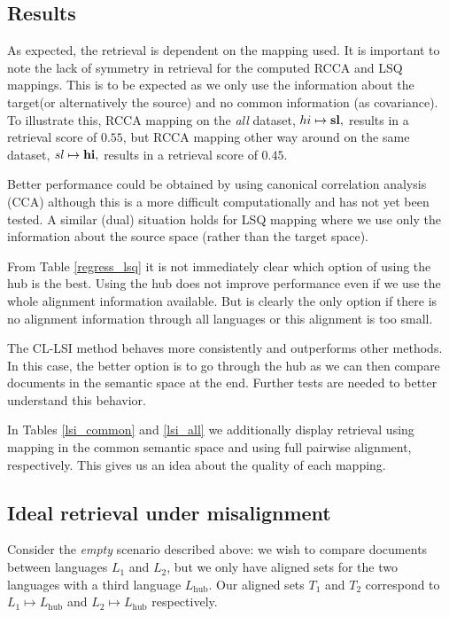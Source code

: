 \documentclass[twocolumn, draft]{article}
\begin{document}
\vspace{-0.2cm}
\subsection{Results}
\vspace{-0.2cm}
As expected, the retrieval is dependent on the mapping used.  It
is important to note the lack of symmetry in retrieval for the
computed RCCA and LSQ mappings.  This is to be expected as we
only use the information about the target(or alternatively the
source) and no common information (as covariance). To illustrate
this, RCCA mapping on the \emph{all} dataset, $hi \mapsto {\bf
  sl},$ results in a retrieval score of $0.55$, but RCCA mapping
other way around on the same dataset, $sl \mapsto {\bf hi},$
results in a retrieval score of $0.45$.

Better performance could be obtained by using canonical
correlation analysis (CCA) although this is a more difficult
computationally and has not yet been tested.  A similar (dual) situation
holds for LSQ mapping where we use only the information about the
source space (rather than the target space).


From Table \ref{regress_lsq} it is not immediately clear which
option of using the hub is the best.  Using the hub does not
improve performance even if we use the whole alignment
information available.  But is clearly the only option if there
is no alignment information through all languages or this
alignment is too small.

The CL-LSI method behaves more consistently and outperforms other
methods.  In this case, the better option is to go through the
hub as we can then compare documents in the semantic space at the
end.  Further tests are needed to better understand this behavior.

In Tables \ref{lsi_common} and \ref{lsi_all} we additionally
display retrieval using mapping in the common semantic space and
using full pairwise alignment, respectively. This gives us an idea
about the quality of each mapping.


\vspace{-0.2cm}
\subsection{Ideal retrieval under  misalignment}
\vspace{-0.2cm}
Consider the \emph{empty} scenario described above: we wish to
compare documents between languages $L_1$ and $L_2$, but we only
have aligned sets for the two languages with a third language
$L_{\mathrm{hub}}$. Our aligned sets $T_1$ and $T_2$
correspond to $ L_1\mapsto L_{\mathrm{hub}}$ and $ L_2\mapsto
L_{\mathrm{hub}}$ respectively.
\end{document}
